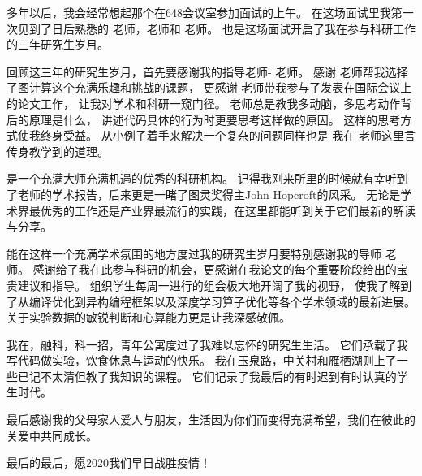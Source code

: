 多年以后，我会经常想起那个在648会议室参加面试的上午。
在这场面试里我第一次见到了日后熟悉的 老师，老师和 老师。
也是这场面试开启了我在参与科研工作的三年研究生岁月。

回顾这三年的研究生岁月，首先要感谢我的指导老师- 老师。
感谢 老师帮我选择了图计算这个充满乐趣和挑战的课题，
更感谢 老师带我参与了发表在国际会议上的论文工作，
让我对学术和科研一窥门径。
 老师总是教我多动脑，多思考动作背后的原理是什么，
讲述代码具体的行为时更要思考这样做的原因。
这样的思考方式使我终身受益。
从小例子着手来解决一个复杂的问题同样也是
我在 老师这里言传身教学到的道理。

是一个充满大师充满机遇的优秀的科研机构。
记得我刚来所里的时候就有幸听到了老师的学术报告，后来更是一睹了图灵奖得主John Hopcroft的风采。
无论是学术界最优秀的工作还是产业界最流行的实践，在这里都能听到关于它们最新的解读与分享。

能在这样一个充满学术氛围的地方度过我的研究生岁月要特别感谢我的导师 老师。
感谢给了我在此参与科研的机会，更感谢在我论文的每个重要阶段给出的宝贵建议和指导。
组织学生每周一进行的组会极大地开阔了我的视野，
使我了解到了从编译优化到异构编程框架以及深度学习算子优化等各个学术领域的最新进展。
关于实验数据的敏锐判断和心算能力更是让我深感敬佩。

我在，融科，科一招，青年公寓度过了我难以忘怀的研究生生活。
它们承载了我写代码做实验，饮食休息与运动的快乐。
我在玉泉路，中关村和雁栖湖则上了一些已记不太清但教了我知识的课程。
它们记录了我最后的有时迟到有时认真的学生时代。

最后感谢我的父母家人爱人与朋友，生活因为你们而变得充满希望，我们在彼此的关爱中共同成长。

最后的最后，愿2020我们早日战胜疫情！


\cleardoublepage[plain]%
